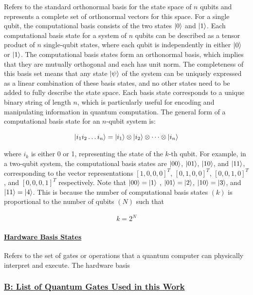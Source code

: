 \documentclass[
]{article}
\begin{document}
Refers to the standard orthonormal basis for the state space of \(n\)
qubits and represents a complete set of orthonormal vectors for this
space. For a single qubit, the computational basis consists of the two
states \(\ket{0}\) and \(\ket{1}\). Each computational basis state for a
system of \(n\) qubits can be described as a tensor product of \(n\)
single-qubit states, where each qubit is independently in either
\(\ket{0}\) or \(\ket{1}\). The computational basis states form an
orthonormal basis, which implies that they are mutually orthogonal and
each has unit norm. The completeness of this basis set means that any
state \(\ket{\psi}\) of the system can be uniquely expressed as a linear
combination of these basis states, and no other states need to be added
to fully describe the state space. Each basis state corresponds to a
unique binary string of length \(n\), which is particularly useful for
encoding and manipulating information in quantum computation. The
general form of a computational basis state for an \(n\)-qubit system
is:

\[
\ket{i_{1} i_{2} \dots i_{n}} = \ket{i_{1}} \otimes \ket{i_{2}} \otimes \cdots \otimes \ket{i_{n}}
\]

where \(i_k\) is either 0 or 1, representing the state of the \(k\)-th
qubit. For example, in a two-qubit system, the computational basis
states are \(\ket{00}\), \(\ket{01}\), \(\ket{10}\), and \(\ket{11}\),
corresponding to the vector representations \([1, 0, 0, 0]^T\),
\([0, 1, 0, 0]^T\), \([0, 0, 1, 0]^T\), and \([0, 0, 0, 1]^T\)
respectively. Note that \(\ket{00} = \ket{1}\) , \(\ket{01}= \ket{2}\),
\(\ket{10}= \ket{3}\), and \(\ket{11}=\ket{4}\). This is because the
number of computational basis states \((k)\) is proportional to the
number of qubits \((N)\) such that

\begin{align}
k = 2^N  
\end{align}

\paragraph*{\texorpdfstring{\underline{Hardware Basis States}}{}}\label{section-14}

Refers to the set of gates or operations that a quantum computer can
physically interpret and execute. The hardware basis

\subsubsection*{\texorpdfstring{\underline{B: List of Quantum Gates Used in this Work}}{}}\label{section-15}
\end{document}
